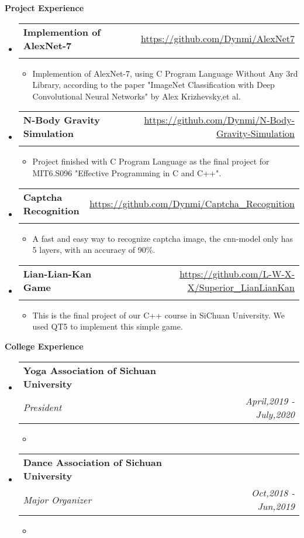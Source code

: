 \documentclass[letterpaper,11pt]{article}
\makeatletter
\newcommand{\resitem}[1]{\item #1 \vspace{-2pt}}
\newcommand{\resheading}[1]{{\large \colorbox{mygrey}{\begin{minipage}{\textwidth}{\textbf{#1 \vphantom{p\^{E}}}}\end{minipage}}}}
\newcommand{\ressubheading}[4]{
\begin{tabular*}{7.0in}{l@{\extracolsep{\fill}}r}
		\textbf{#1} & #2 \\
		\textit{#3} & \textit{#4} \\
\end{tabular*}\vspace{-6pt}}
\makeatother
\begin{document}
\resheading{Project Experience}
\begin{itemize}
\item
	\ressubheading{Implemention of AlexNet-7 }{\href{https://github.com/Dynmi/AlexNet7}{https://github.com/Dynmi/AlexNet7}}{}{}
	\begin{itemize}
		\resitem{Implemention of AlexNet-7, using C Program Language Without Any 3rd Library, according to the paper "ImageNet Classification with Deep Convolutional
Neural Networks" by Alex Krizhevsky,et al.}
	\end{itemize}
\item
	\ressubheading{N-Body Gravity Simulation}{\href{https://github.com/Dynmi/N-Body-Gravity-Simulation}{https://github.com/Dynmi/N-Body-Gravity-Simulation}}{}{}
	\begin{itemize}
		\resitem{Project finished with C Program Language as the final project for MIT6.S096 "Effective Programming in C and C++".}
	\end{itemize}
\item
	\ressubheading{Captcha Recognition}{\href{https://github.com/Dynmi/Captcha\_Recognition}{https://github.com/Dynmi/Captcha\_Recognition}}{}{}
	\begin{itemize}
		\resitem{} A fast and easy way to recognize captcha image, the cnn-model only has 5 layers, with an accuracy of 90\%.
	\end{itemize}
\item
	\ressubheading{Lian-Lian-Kan Game}{\href{https://github.com/L-W-X-X/Superior\_LianLianKan}{https://github.com/L-W-X-X/Superior\_LianLianKan}}{}{}
	\begin{itemize}
		\resitem{} This is the final project of our C++ course in SiChuan University. We used QT5 to implement this simple game.
	\end{itemize}

\end{itemize}


\resheading{College Experience}
\begin{itemize}
\item
	\ressubheading{Yoga Association of Sichuan University}{}{President}{April,2019 - July,2020}
	\begin{itemize}
		\resitem{}
	\end{itemize}
\item
	\ressubheading{Dance Association of Sichuan University}{}{Major Organizer}{Oct,2018 - Jun,2019}
	\begin{itemize}
		\resitem{}
	\end{itemize}

\end{itemize}
\end{document}
